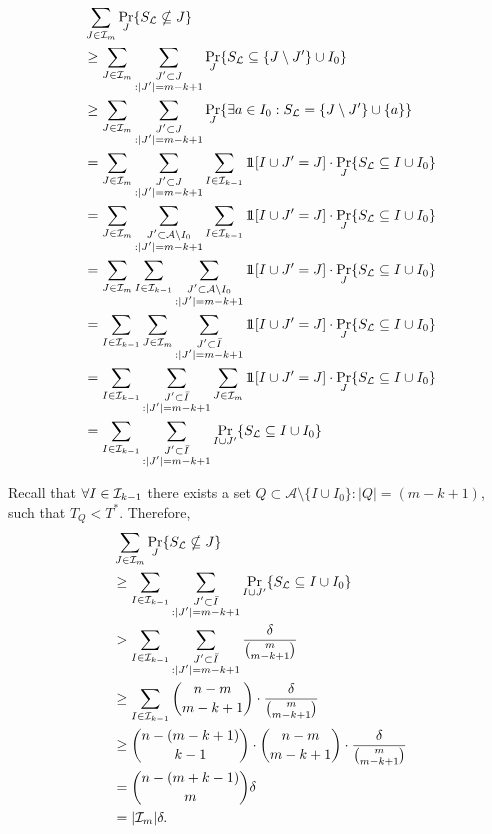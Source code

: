 \begin{align*}
 & \sum_{J \in \I_m} \Pr_J\{S_\mathcal{L} \nsubseteq J\} \\
 & \geq \sum_{J \in \I_m} \sum_{\substack{J' \subset J\\ : |J'| = m-k+1}} \Pr_J\{S_\mathcal{L} \subseteq \{J \setminus J'\} \cup I_0\} \\
 & \geq \sum_{J \in \I_m} \sum_{\substack{J' \subset J\\ : |J'| = m-k+1}} \Pr_J\{\exists a \in I_0: S_\mathcal{L} = \{J \setminus J'\} \cup\{a\}\} \\
 & = \sum_{J \in \I_m} \sum_{\substack{J' \subset J\\ : |J'| = m-k+1}} \sum_{I\in\I_{k-1}} \idop[I \cup J'= J] \cdot \Pr_J\{S_\mathcal{L} \subseteq I \cup I_0\}\\
 & = \sum_{J \in \I_m} \sum_{\substack{J' \subset \mathcal{A}\setminus I_0\\ : |J'| = m-k+1}} \sum_{I\in\I_{k-1}} \idop[I \cup J'= J] \cdot \Pr_J\{S_\mathcal{L} \subseteq I \cup I_0\}\\
 & = \sum_{J \in \I_m}  \sum_{I\in\I_{k-1}} \sum_{\substack{J' \subset \mathcal{A}\setminus I_0\\ : |J'| = m-k+1}}\idop[I \cup J'= J] \cdot \Pr_J\{S_\mathcal{L} \subseteq I \cup I_0\}\\
 & = \sum_{I\in\I_{k-1}} \sum_{J \in \I_m} \sum_{\substack{J' \subset \bar{I}\\ : |J'| = m-k+1}}\idop[I \cup J'= J] \cdot \Pr_J\{S_\mathcal{L} \subseteq I \cup I_0\}\\
 & = \sum_{I\in\I_{k-1}} \sum_{\substack{J' \subset \bar{I}\\ : |J'| = m-k+1}} \sum_{J \in \I_m} \idop[I \cup J'= J] \cdot \Pr_J\{S_\mathcal{L} \subseteq I \cup I_0\}\\
 & = \sum_{I\in\I_{k-1}} \sum_{\substack{J' \subset \bar{I}\\ : |J'| = m-k+1}} \Pr_{I\cup J'}\{S_\mathcal{L} \subseteq I \cup I_0\}
\end{align*}

Recall that $\forall I \in \mathcal{I}_{k-1}$ there exists a set $Q \subset \mathcal{A}\setminus\{I\cup I_0\}: |Q| = (m-k+1)$,
such that $T_Q < T^*$. Therefore,
\begin{align*}
 & \sum_{J \in \mathcal{I}_m} \Pr_J\{S_\mathcal{L} \nsubseteq J\}\\
 & \geq \sum_{I\in\mathcal{I}_{k-1}} \sum_{\substack{J' \subset \bar{I}\\ : |J'| = m-k+1}} \Pr_{I\cup J'}\{S_\mathcal{L} \subseteq I \cup I_0\}\\
 & > \sum_{I\in\mathcal{I}_{k-1}} \sum_{\substack{J' \subset \bar{I}\\ : |J'| = m-k+1}} \frac{\delta}{\binom{m}{m-k+1}}\\
 & \geq \sum_{I\in\mathcal{I}_{k-1}} \binom{n-m}{m-k+1} \cdot \frac{\delta}{\binom{m}{m-k+1}}\\
 & \geq \binom{n-(m-k+1)}{k-1} \cdot \binom{n-m}{m-k+1} \cdot \frac{\delta}{\binom{m}{m-k+1}}\\
 & = \binom{n-(m+k-1)}{m} \delta\\
 & = |\mathcal{I}_m| \delta.
\end{align*}

